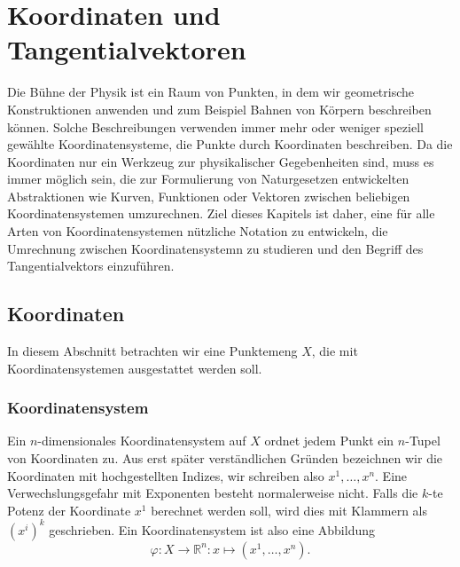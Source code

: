 %
%
%
\chapter{Koordinaten und Tangentialvektoren
\label{chapter:koordinaten}}
Die Bühne der Physik ist ein Raum von Punkten, in dem wir geometrische
Konstruktionen anwenden und zum Beispiel Bahnen von Körpern beschreiben
können.
Solche Beschreibungen verwenden immer mehr oder weniger speziell gewählte
Koordinatensysteme, die Punkte durch Koordinaten beschreiben.
Da die Koordinaten nur ein Werkzeug zur physikalischer Gegebenheiten
sind, muss es immer möglich sein, die zur Formulierung von Naturgesetzen
entwickelten Abstraktionen wie Kurven, Funktionen oder Vektoren zwischen
beliebigen Koordinatensystemen umzurechnen.
Ziel dieses Kapitels ist daher, eine für alle Arten von Koordinatensystemen
nützliche Notation zu entwickeln, die Umrechnung zwischen Koordinatensystemn
zu studieren und den Begriff des Tangentialvektors einzuführen.

%
%
\section{Koordinaten
\label{buch:koordinaten:section:koordinaten}}
In diesem Abschnitt betrachten wir eine Punktemeng $X$, die mit
Koordinatensystemen ausgestattet werden soll.

\subsection{Koordinatensystem}
Ein $n$-dimensionales Koordinatensystem auf $X$ ordnet jedem Punkt 
ein $n$-Tupel von Koordinaten zu.
Aus erst später verständlichen Gründen bezeichnen wir die Koordinaten
mit hochgestellten Indizes, wir schreiben also $x^1,\dots,x^n$.
Eine Verwechslungsgefahr mit Exponenten besteht normalerweise nicht.
Falls die $k$-te Potenz der Koordinate $x^1$ berechnet werden soll, 
wird dies mit Klammern als $(x^i)^k$ geschrieben.
Ein Koordinatensystem ist also eine Abbildung
\[
\varphi
\colon
X\to \mathbb{R}^n
:
x \mapsto (x^1,\dots,x^n).
\]

